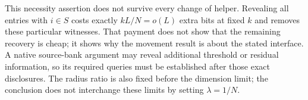 This necessity assertion does not survive every change of helper.
Revealing all entries with $i\in S$ costs exactly $kL/N=o(L)$ extra
bits at fixed $k$ and removes these particular witnesses.  That payment
does not show that the remaining recovery is cheap; it shows why the
movement result is about the stated interface.  A native source-bank
argument may reveal additional threshold or residual information, so
its required queries must be established after those exact disclosures.
The radius ratio is also fixed before the dimension limit; the
conclusion does not interchange these limits by setting $\lambda=1/N$.
